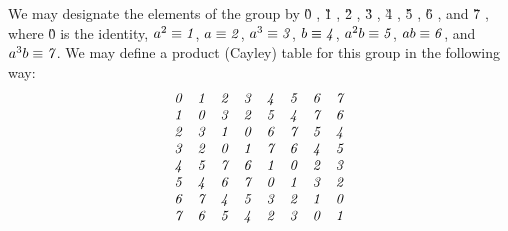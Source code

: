 \documentclass[12pt]{article}
\begin{document}
 We may designate the elements of the group by \G0 , \G1 , \G2 , \G3 , \G4 ,
\G5 , \G6 , and \G7 , where \G0 is the identity,
$a^2 \equiv \G1$, $a \equiv \G2$, $a^3 \equiv \G3$,
$b \equiv \G4$, $a^2 b \equiv \G5$, $a b \equiv \G6$, and $a^3 b \equiv
\G7$.  We may define a product (Cayley) table for this group in the following
way:
\begin{equation}
\begin{array}{cccccccc}
\G0 & \G1 & \G2 & \G3 & \G4 & \G5 & \G6 & \G7 \\
\G1 & \G0 & \G3 & \G2 & \G5 & \G4 & \G7 & \G6 \\
\G2 & \G3 & \G1 & \G0 & \G6 & \G7 & \G5 & \G4 \\
\G3 & \G2 & \G0 & \G1 & \G7 & \G6 & \G4 & \G5 \\
\G4 & \G5 & \G7 & \G6 & \G1 & \G0 & \G2 & \G3 \\
\G5 & \G4 & \G6 & \G7 & \G0 & \G1 & \G3 & \G2 \\
\G6 & \G7 & \G4 & \G5 & \G3 & \G2 & \G1 & \G0 \\
\G7 & \G6 & \G5 & \G4 & \G2 & \G3 & \G0 & \G1
\end{array}
\end{equation}
\end{document}
